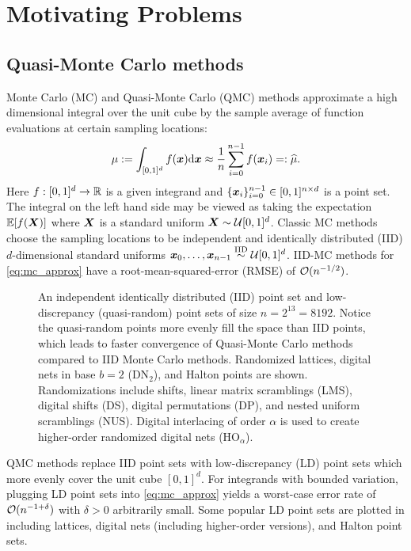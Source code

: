 \documentclass[acmsmall]{acmart}
\begin{document}
\section{Motivating Problems} 

\subsection{Quasi-Monte Carlo methods}

Monte Carlo (MC) and Quasi-Monte Carlo (QMC) methods approximate a high dimensional integral over the unit cube by the sample average of function evaluations at certain sampling locations:
\begin{equation}
    \mu := \int_{[0,1]^d} f({\boldsymbol{x}}) \mathrm{d} {\boldsymbol{x}} \approx \frac{1}{n} \sum_{i=0}^{n-1} f({\boldsymbol{x}}_i) =: {\widehat{\mu}}.
    \label{eq:mc_approx}
\end{equation}
Here $f: [0,1]^d \to {\mathbb{R}}$ is a given integrand and $\{{\boldsymbol{x}}_i\}_{i=0}^{n-1} \in [0,1]^{n \times d}$ is a point set. The integral on the left hand side may be viewed as taking the expectation ${\mathbb{E}}[f({\boldsymbol{X}})]$ where ${\boldsymbol{X}}$ is a standard uniform ${\boldsymbol{X}} \sim {\mathcal{U}}[0,1]^d$. Classic MC methods choose the sampling locations to be independent and identically distributed (IID) $d$-dimensional standard uniforms ${\boldsymbol{x}}_0,\dots,{\boldsymbol{x}}_{n-1} \overset{\mathrm{IID}}{\sim} {\mathcal{U}}[0,1]^d$. IID-MC methods for \eqref{eq:mc_approx} have a root-mean-squared-error (RMSE) of ${\mathcal{O}}(n^{-1/2})$.

\begin{figure}%
    \centering
    \caption{An independent identically distributed (IID) point set and low-discrepancy (quasi-random) point sets of size $n=2^{13}=8192$. Notice the quasi-random points more evenly fill the space than IID points, which leads to faster convergence of Quasi-Monte Carlo methods compared to IID Monte Carlo methods. Randomized lattices, digital nets in base $b=2$ (DN${}_{2}$), and Halton points are shown. Randomizations include shifts, linear matrix scramblings (LMS), digital shifts (DS), digital permutations (DP), and nested uniform scramblings (NUS). Digital interlacing of order $\alpha$ is used to create higher-order randomized digital nets (HO${}_\alpha$).}
    \Description[]{}
    \label{fig:point sets}
\end{figure}

QMC methods \citep{niederreiter.qmc_book,dick.digital_nets_sequences_book,kroese.handbook_mc_methods,dick2022lattice,lemieux2009monte,sloan1994lattice,dick.high_dim_integration_qmc_way} replace IID point sets with low-discrepancy (LD) point sets which more evenly cover the unit cube $[0,1]^d$. For integrands with bounded variation, plugging LD point sets into \eqref{eq:mc_approx} yields a worst-case error rate of ${\mathcal{O}}(n^{-1+\delta})$ with $\delta>0$ arbitrarily small. Some popular LD point sets are plotted in  including lattices, digital nets (including higher-order versions), and Halton point sets.
\end{document}
